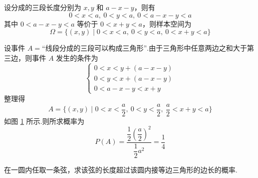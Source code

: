\begin{solution}
    设分成的三段长度分别为 $x, y$ 和 $a-x-y$，则有
    $$
    0<x<a,\ 0<y<a,\ 0 < a-x-y < a
    $$
    其中 $0 < a-x-y < a$ 等价于 $0 < x+y < a$，则样本空间为
    $$
    \varOmega = \{ (x,y) \mid 0<x<a,\ 0<y<a,\ 0 < x+y < a \}
    $$

    设事件 $A = \text{“线段分成的三段可以构成三角形”}$.由于三角形中任意两边之和大于第三边，则事件 $A$ 发生的条件为
    $$
    \begin{cases}
        0 < x < y + (a-x-y) \\
        0 < y < x + (a-x-y) \\
        0 < a-x-y < x+y
    \end{cases}
    $$
    整理得
    $$
    A = \{ (x,y) \mid 0 < x < \dfrac{a}{2},\ 0 < y < \dfrac{a}{2},\ \dfrac{a}{2} < x+y < a \}
    $$
    如图 \ref{fig:example-三角形} 所示.则所求概率为
    $$
    P(A) = \dfrac{\dfrac{1}{2} \left( \dfrac{a}{2} \right)^2}{\dfrac{1}{2} a^2} = \dfrac{1}{4}
    $$

    \begin{figure}[H]
        \centering


        \vspace{-0.8em}
        
        \caption{}
        \label{fig:example-三角形}
    \end{figure}
\end{solution}

\begin{example}[][贝特朗奇论]
    \indent 在一圆内任取一条弦，求该弦的长度超过该圆内接等边三角形的边长的概率.
\end{example}

